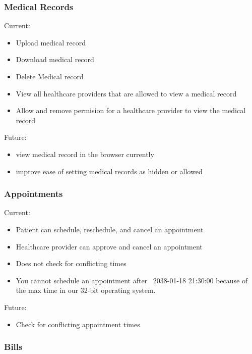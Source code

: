 \documentclass[12pt]{report}
\begin{document}
\subsubsection{Medical Records}

Current: 
\begin{itemize}
\item Upload medical record
\item Download medical record
\item Delete Medical record
\item View all healthcare providers that are allowed to view a medical record
\item Allow and remove permision for a healthcare provider to view the medical record
\end{itemize}
Future:
\begin{itemize}
\item view medical record in the browser currently 
\item improve ease of setting medical records as hidden or allowed
\end{itemize}

\subsubsection{Appointments}
Current: 
\begin{itemize}
\item Patient can schedule, reschedule, and cancel an appointment
\item Healthcare provider can approve and cancel an appointment
\item Does not check for conflicting times 
\item You cannot schedule an appointment after ~2038-01-18 21:30:00 because of the max time in our 32-bit operating system. 
\end{itemize}
Future: 
\begin{itemize}
\item Check for conflicting appointment times
\end{itemize}

\subsubsection{Bills}
\end{document}
